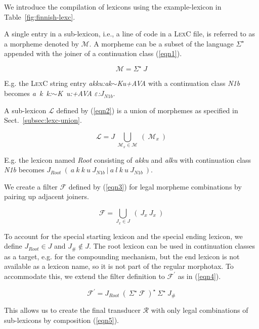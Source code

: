 \documentclass[postprint]{flammie}
\begin{document}
We introduce the compilation of lexicons using the example-lexicon in
Table~\ref{fig:finnish-lexc}.

A single entry in a sub-lexicon, i.e., a line of code in a
\textsc{LexC} file, is referred to as a morpheme denoted by
$\mathcal{M}$. A morpheme can be a subset of the language
$\Sigma^{\star}$ appended with the joiner of a continuation class
(\ref{eqn1}).

\begin{equation}
  \label{eqn1}
  \mathcal{M} = \Sigma^{\star}~J
\end{equation}

E.g. the \textsc{LexC} string entry \emph{akku\text:ak$\sim$Ku+AVA}
with a continuation class \emph{N1b} becomes
\emph{a~k~k:$\sim$K~u:+AVA $\varepsilon$:$J_{N1b}$}.

A sub-lexicon $\mathcal{L}$ defined by (\ref{eqn2}) is a union of
morphemes as specified in Sect.~\ref{subsec:lexc-union}.

\begin{equation}
  \label{eqn2}
  \mathcal{L} = J~\bigcup_{\mathcal{M}_{x} \in \mathcal{M}}~(~\mathcal{M}_{x}~)
\end{equation}

E.g. the lexicon named \emph{Root} consisting of \emph{akku} and
\emph{alku} with continuation class \emph{N1b} becomes
$J_{Root}~(~a~k~k~u~J_{N1b}~|~a~l~k~u~J_{N1b}~)$.

We create a filter $\mathcal{F}$ defined by (\ref{eqn3}) for legal
morpheme combinations by pairing up adjacent joiners.

\begin{equation}
  \label{eqn3}
  \mathcal{F} = \bigcup_{J_{x} \in J}~(~J_{x}~J_{x}~)
\end{equation}

To account for the special starting lexicon and the special ending
lexicon, we define $J_{Root} \in J$ and $J_{\#} \notin J$. The root
lexicon can be used in continuation classes as a target, e.g. for the
compounding mechanism, but the end lexicon is not available as a
lexicon name, so it is not part of the regular morphotax. To
accommodate this, we extend the filter definition to
$\mathcal{F}^{\prime}$ as in (\ref{eqn4}).

\begin{equation}
  \label{eqn4}
  \mathcal{F}^{\prime} = J_{Root}~(~\Sigma^{\star}~\mathcal{F}~)^{\star}~\Sigma^{\star}~J_{\#}
\end{equation}

This allows us to create the final transducer $\mathcal{R}$ with only
legal combinations of sub-lexicons by composition (\ref{eqn5}).
\end{document}
